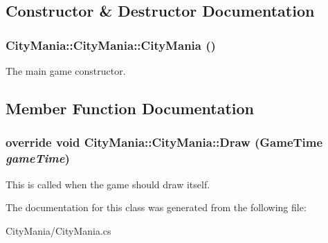 \subsection{Constructor \& Destructor Documentation}
\hypertarget{classCityMania_1_1CityMania_ac7ae0c2da8da3eedb375fc38e83cd77b}{
\subsubsection[{CityMania}]{\setlength{\rightskip}{0pt plus 5cm}CityMania::CityMania::CityMania ()}}
\label{classCityMania_1_1CityMania_ac7ae0c2da8da3eedb375fc38e83cd77b}


The main game constructor. 

\subsection{Member Function Documentation}
\hypertarget{classCityMania_1_1CityMania_af68340ca372af124db302497f359dbbc}{
\subsubsection[{Draw}]{\setlength{\rightskip}{0pt plus 5cm}override void CityMania::CityMania::Draw (GameTime {\em gameTime})}}
\label{classCityMania_1_1CityMania_af68340ca372af124db302497f359dbbc}


This is called when the game should draw itself. 

The documentation for this class was generated from the following file:\begin{DoxyCompactItemize}
\item 
CityMania/CityMania.cs\end{DoxyCompactItemize}
